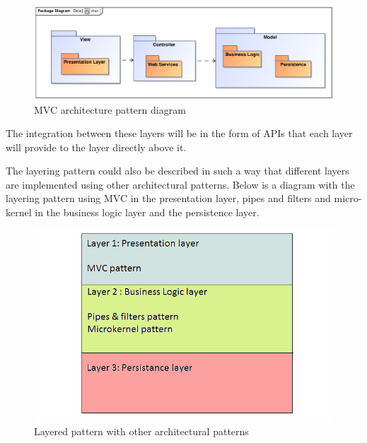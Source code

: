 \documentclass[a4paper]{article}
\begin{document}
\begin{figure}[H]                                                                                                                                               
\includegraphics[width=\textwidth]{mvc.eps}
\caption{MVC architecture pattern diagram \label{overflow}}
\end{figure}                                                        
                                                                                                                                                                                       The integration between these layers will be in the form of APIs that each layer will provide to the layer directly above it.

The layering pattern could also be described in such a way that different layers are implemented using other architectural patterns. Below is a diagram with the layering pattern using MVC in the presentation layer, pipes and filters and micro-kernel in the business logic layer and the persistence layer.

\begin{figure}[H]                                                                                                                                               
\includegraphics[width=\textwidth]{layers_2.png}
\caption{Layered pattern with other architectural patterns \label{overflow}}
\end{figure} 
																																													   
\end{document}
